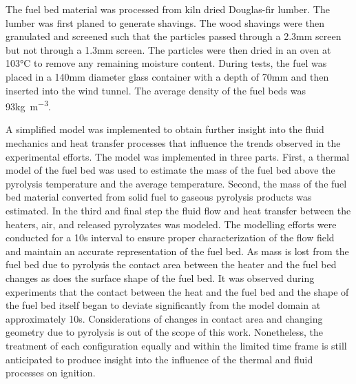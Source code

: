     The fuel bed material was processed from kiln dried Douglas-fir lumber. The lumber was first planed to generate shavings. The wood shavings were then granulated and screened such that the particles passed through a 2.3\si{\milli\meter} screen but not through a 1.3\si{\milli\meter} screen. The particles were then dried in an oven at 103\si{\celsius} to remove any remaining moisture content. During tests, the fuel was placed in a 140\si{\milli\meter} diameter glass container with a depth of 70\si{\milli\meter} and then inserted into the wind tunnel. The average density of the fuel beds was 93\si{\kilo\gram\per\cubic\meter}.
    
    A simplified model was implemented to obtain further insight into the fluid mechanics and heat transfer processes that influence the trends observed in the experimental efforts. The model was implemented in three parts. First, a thermal model of the fuel bed was used to estimate the mass of the fuel bed above the pyrolysis temperature and the average temperature. Second, the mass of the fuel bed material converted from solid fuel to gaseous pyrolysis products was estimated. In the third and final step the fluid flow and heat transfer between the heaters, air, and released pyrolyzates was modeled. The modelling efforts were conducted for a 10\si{\second} interval to ensure proper characterization of the flow field and maintain an accurate representation of the fuel bed. As mass is lost from the fuel bed due to pyrolysis the contact area between the heater and the fuel bed changes as does the surface shape of the fuel bed. It was observed during experiments that the contact between the heat and the fuel bed and the shape of the fuel bed itself began to deviate significantly from the model domain at approximately 10\si{\second}. Considerations of changes in contact area and changing geometry due to pyrolysis is out of the scope of this work. Nonetheless, the treatment of each configuration equally and within the limited time frame is still anticipated to produce insight into the influence of the thermal and fluid processes on ignition. 
    
